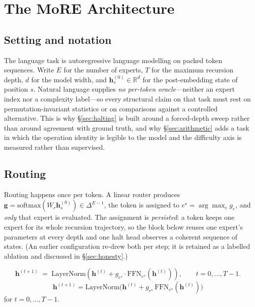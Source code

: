 \section{The MoRE Architecture}
\label{sec:method}

\subsection{Setting and notation}

The language task is autoregressive language modelling on packed token sequences.
Write
$E$ for the number of experts, $T$ for the maximum recursion depth, $d$ for the
model width, and $\mathbf{h}^{(0)}_s \in \mathbb{R}^{d}$ for the post-embedding
state of position $s$. Natural language supplies \emph{no per-token
oracle}---neither an expert index nor a complexity label---so every structural
claim on that task must rest on permutation-invariant statistics or on
comparisons against a controlled alternative. This is why
\S\ref{sec:halting} is built around a forced-depth sweep rather than around
agreement with ground truth, and why \S\ref{sec:arithmetic} adds a task in which
the operation identity is legible to the model and the difficulty axis is
measured rather than supervised.

\subsection{Routing}

Routing happens once per token. A linear router produces
$\mathbf{g} = \mathrm{softmax}(W_r \mathbf{h}^{(0)}_s) \in \Delta^{E-1}$, the
token is assigned to $e^\star = \arg\max_e g_e$, and \emph{only} that expert is
evaluated. The assignment is \emph{persisted}: a token keeps one expert for its
whole recursion trajectory, so the block below reuses one expert's parameters at
every depth and one halt head observes a coherent sequence of states. (An earlier
configuration re-drew both per step; it is retained as a labelled ablation and
discussed in \S\ref{sec:honesty}.)

{\dispsize
\begin{equation}
\mathbf{h}^{(t+1)} \;=\; \mathrm{LayerNorm}\!\left(
  \mathbf{h}^{(t)} + g_{e^\star}\cdot \mathrm{FFN}_{e^\star}\!\left(\mathbf{h}^{(t)}\right)
\right), \qquad t = 0,\dots,T-1 .
\label{eq:block}
\end{equation}
}
{\dispsize
\begin{equation}
\mathbf{h}^{(t+1)} = \mathrm{LayerNorm}\big(
  \mathbf{h}^{(t)} + g_{e^\star}\,\mathrm{FFN}_{e^\star}(\mathbf{h}^{(t)})
\big)
\label{eq:block}
\end{equation}
}
for $t = 0,\dots,T-1$.

